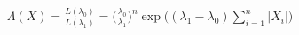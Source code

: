 \documentclass[preview]{standalone}
\begin{document}
\begin{align*}
\Lambda(X) = \frac{L(\lambda_0)}{L(\lambda_1)} = \bigl(\tfrac{\lambda_0}{\lambda_1}\bigr)^n \exp\bigl((\lambda_1-\lambda_0)\sum_{i=1}^n|X_i|\bigr)
\end{align*}
\end{document}
